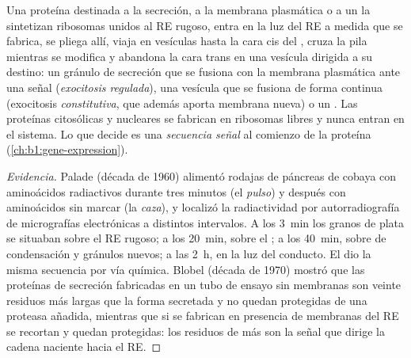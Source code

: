\begin{proposition}\label{prop:b1:eukaryotic-cell:secretory}
Una proteína destinada a la secreción, a la membrana plasmática o a un
 la sintetizan ribosomas unidos al RE rugoso, entra en la luz del RE
a medida que se fabrica, se pliega allí, viaja en vesículas hasta la cara
cis del , cruza la pila mientras se modifica y abandona la cara trans
en una vesícula dirigida a su destino: un gránulo de secreción que se
fusiona con la membrana plasmática ante una señal (\emph{exocitosis
regulada}), una vesícula que se fusiona de forma continua
(exocitosis \emph{constitutiva}, que además aporta membrana nueva) o un
. Las proteínas citosólicas y nucleares se fabrican en ribosomas
libres y nunca entran en el sistema. Lo que decide es una \emph{secuencia
señal} al comienzo de la proteína
(\cref{ch:b1:gene-expression}).
\end{proposition}
\begin{proof}[Evidencia]
Palade (década de 1960) alimentó rodajas de páncreas de cobaya con
aminoácidos radiactivos durante tres minutos (el \emph{pulso}) y después con
aminoácidos sin marcar (la \emph{caza}), y localizó la radiactividad por
autorradiografía de micrografías electrónicas a distintos intervalos. A los
\qty{3}{min} los granos de plata se situaban sobre el RE rugoso; a los
\qty{20}{min}, sobre el ; a los \qty{40}{min}, sobre  de
condensación y gránulos nuevos; a las \qty{2}{h}, en la luz del conducto. El
 dio la misma secuencia por vía química. Blobel
(década de 1970) mostró que las proteínas de secreción fabricadas en un tubo
de ensayo sin membranas son veinte residuos más largas que la forma
secretada y no quedan protegidas de una proteasa añadida, mientras que si se
fabrican en presencia de membranas del RE se recortan y quedan protegidas:
los residuos de más son la señal que dirige la cadena naciente hacia el RE.
\end{proof}

